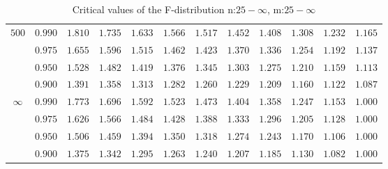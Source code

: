 \documentclass[11pt]{article}
\theoremstyle{definition}
\begin{document}
\begin{table}[H]
\begin{tabularx}{\linewidth}{c | c | c c c c c c c c c c}
		$500$ & $0.990$ & $1.810$ & $1.735$ & $1.633$ & $1.566$ & $1.517$ & $1.452$ & $1.408$ & $1.308$ & $1.232$ & $1.165$ \\
		& $0.975$ & $1.655$ & $1.596$ & $1.515$ & $1.462$ & $1.423$ & $1.370$ & $1.336$ & $1.254$ & $1.192$ & $1.137$ \\
		& $0.950$ & $1.528$ & $1.482$ & $1.419$ & $1.376$ & $1.345$ & $1.303$ & $1.275$ & $1.210$ & $1.159$ & $1.113$ \\
		& $0.900$ & $1.391$ & $1.358$ & $1.313$ & $1.282$ & $1.260$ & $1.229$ & $1.209$ & $1.160$ & $1.122$ & $1.087$ \\
		$\infty$ & $0.990$ & $1.773$ & $1.696$ & $1.592$ & $1.523$ & $1.473$ & $1.404$ & $1.358$ & $1.247$ & $1.153$ & $1.000$ \\
		& $0.975$ & $1.626$ & $1.566$ & $1.484$ & $1.428$ & $1.388$ & $1.333$ & $1.296$ & $1.205$ & $1.128$ & $1.000$ \\
		& $0.950$ & $1.506$ & $1.459$ & $1.394$ & $1.350$ & $1.318$ & $1.274$ & $1.243$ & $1.170$ & $1.106$ & $1.000$ \\
		& $0.900$ & $1.375$ & $1.342$ & $1.295$ & $1.263$ & $1.240$ & $1.207$ & $1.185$ & $1.130$ & $1.082$ & $1.000$
	\end{tabularx}
	\caption{Critical values of the F-distribution n:$25-\infty$, m:$25-\infty$}
	\label{tbl:FdistributionEnd}
\end{table}
\end{document}
